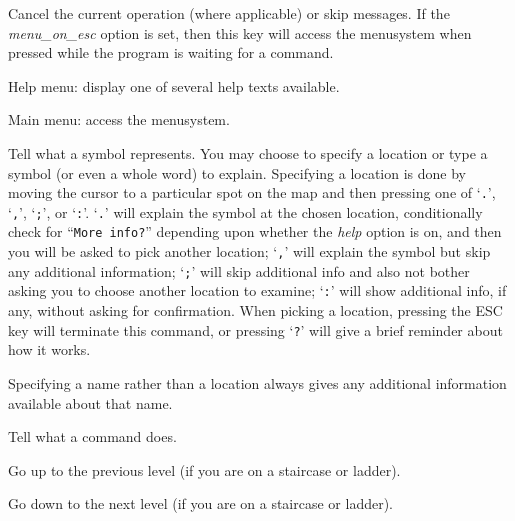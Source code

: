 \item[\tb{{\rm ESC}}]
Cancel the current operation (where applicable) or skip messages. If the
{\it menu_on_esc\/} 
option is set, then this key will access the menusystem when pressed while
the program is waiting for a command.

\item[\tb{?}]
Help menu:  display one of several help texts available.

\item[\tb{`}]
Main menu:  access the menusystem.

\item[\tb{/}]
Tell what a symbol represents.  You may choose to specify a location
or type a symbol (or even a whole word) to explain.
Specifying a location is done by moving the cursor to a particular spot
on the map and then pressing one of `{\tt .}', `{\tt ,}', `{\tt ;}',
or `{\tt :}'.  `{\tt .}' will explain the symbol at the chosen location,
conditionally check for ``{\tt More info?}'' depending upon whether the
{\it help\/} 
option is on, and then you will be asked to pick another location;
`{\tt ,}' will explain the symbol but skip any additional
information; `{\tt ;}' will skip additional info and also not bother asking
you to choose another location to examine; `{\tt :}' will show additional
info, if any, without asking for confirmation.  When picking a location,
pressing the ESC key will terminate this command, or pressing `{\tt ?}'
will give a brief reminder about how it works.

Specifying a name rather than a location
always gives any additional information available about that name.

\item[\tb{\&}]
Tell what a command does.

\item[\tb{<}]
Go up to the previous level (if you are on a staircase or ladder).

\item[\tb{>}]
Go down to the next level (if you are on a staircase or ladder).

